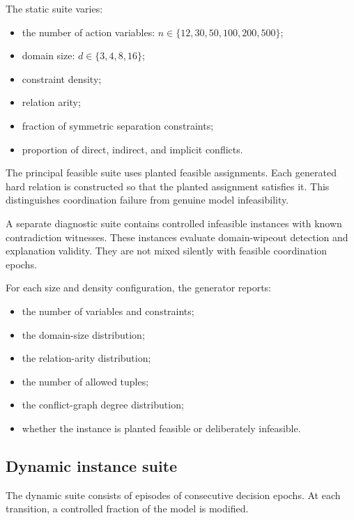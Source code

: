 \documentclass[pdflatex,sn-mathphys-num,iicol,oneside]{sn-jnl}
\begin{document}
The static suite varies:

\begin{itemize}
    \item the number of action variables:
    $n\in\{12,30,50,100,200,500\}$;
    \item domain size:
    $d\in\{3,4,8,16\}$;
    \item constraint density;
    \item relation arity;
    \item fraction of symmetric separation constraints;
    \item proportion of direct, indirect, and implicit conflicts.
\end{itemize}

The principal feasible suite uses planted feasible assignments. Each
generated hard relation is constructed so that the planted assignment
satisfies it. This distinguishes coordination failure from genuine
model infeasibility.

A separate diagnostic suite contains controlled infeasible instances
with known contradiction witnesses. These instances evaluate
domain-wipeout detection and explanation validity. They are not mixed
silently with feasible coordination epochs.

For each size and density configuration, the generator reports:

\begin{itemize}
    \item the number of variables and constraints;
    \item the domain-size distribution;
    \item the relation-arity distribution;
    \item the number of allowed tuples;
    \item the conflict-graph degree distribution;
    \item whether the instance is planted feasible or deliberately
    infeasible.
\end{itemize}

\subsection{Dynamic instance suite}

The dynamic suite consists of episodes of consecutive decision
epochs. At each transition, a controlled fraction of the model is
modified.
\end{document}

